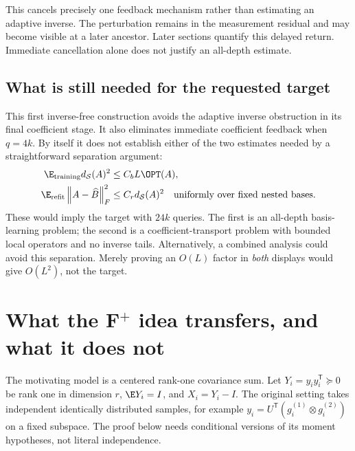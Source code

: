 \documentclass[11pt,oneside,openany,a4paper]{book}
\numberwithin{equation}{chapter}
\theoremstyle{definition}
\theoremstyle{remark}
\newcommand{\T}{\mathsf T}\newcommand{\Id}{I}
\newcommand{\F}[1]{\left\lVert#1\right\rVert_F}
\begin{document}
This cancels precisely one feedback mechanism rather than estimating an
adaptive inverse. The perturbation remains in the measurement residual
and may become visible at a later ancestor. Later sections quantify this delayed return. Immediate cancellation alone does not justify an all-depth estimate.

\subsection{What is still needed for the requested target}
This first inverse-free construction avoids the adaptive inverse obstruction in its
final coefficient stage. It also eliminates immediate coefficient feedback
when $q=4k$. By itself it does not establish either of the two estimates needed by a
straightforward separation argument:
\begin{align*}
 \E_{\rm training}d_{\mathcal S}(A)^2&\le C_b L\OPT(A),\\
 \E_{\rm refit}\F{A-\widehat B}^2&\le C_r d_{\mathcal S}(A)^2
       \quad\text{uniformly over fixed nested bases.}
\end{align*}
These would imply the target with $24k$ queries. The first is an
all-depth basis-learning problem; the second is a coefficient-transport
problem with bounded local operators and no inverse tails. Alternatively,
a combined analysis could avoid this separation. Merely proving an
$O(L)$ factor in \emph{both} displays would give $O(L^2)$, not the target.



\section{What the \texorpdfstring{F$^+$}{F+} idea transfers, and what it does not}\label{base:new:fp}
The motivating model is a centered rank-one covariance sum. Let $Y_i=y_iy_i^\T\succeq0$ be rank one in dimension $r$, $\E Y_i=I$, and $X_i=Y_i-I$. The original setting takes independent identically distributed samples, for example $y_i=U^\T(g_i^{(1)}\otimes g_i^{(2)})$ on a fixed subspace. The proof below needs conditional versions of its moment hypotheses, not literal independence.
\end{document}
